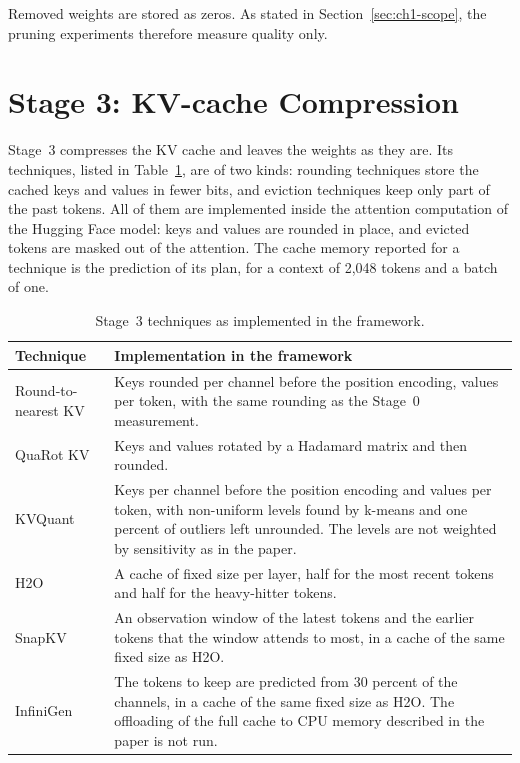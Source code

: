 Removed weights are stored as zeros. As stated in Section~\ref{sec:ch1-scope}, the pruning experiments therefore measure quality only.

\section{Stage 3: KV-cache Compression}
\label{sec:ch4-stage3}

Stage~3 compresses the KV cache and leaves the weights as they are. Its techniques, listed in Table~\ref{tab:ch4-stage3}, are of two kinds: rounding techniques store the cached keys and values in fewer bits, and eviction techniques keep only part of the past tokens. All of them are implemented inside the attention computation of the Hugging Face model: keys and values are rounded in place, and evicted tokens are masked out of the attention. The cache memory reported for a technique is the prediction of its plan, for a context of 2{,}048 tokens and a batch of one.

\begin{table}[htbp]
\centering
\small
\caption{Stage~3 techniques as implemented in the framework.}
\label{tab:ch4-stage3}
\renewcommand{\arraystretch}{1.2}
\begin{tabularx}{\textwidth}{lX}
\hline
\textbf{Technique} & \textbf{Implementation in the framework} \\
\hline
Round-to-nearest KV & Keys rounded per channel before the position encoding, values per token, with the same rounding as the Stage~0 measurement. \\
QuaRot KV \cite{ashkboos2024quarot} & Keys and values rotated by a Hadamard matrix and then rounded. \\
KVQuant \cite{hooper2024kvquant} & Keys per channel before the position encoding and values per token, with non-uniform levels found by k-means and one percent of outliers left unrounded. The levels are not weighted by sensitivity as in the paper. \\
H2O \cite{zhang2023h2o} & A cache of fixed size per layer, half for the most recent tokens and half for the heavy-hitter tokens. \\
SnapKV \cite{li2024snapkv} & An observation window of the latest tokens and the earlier tokens that the window attends to most, in a cache of the same fixed size as H2O. \\
InfiniGen \cite{lee2024infinigen} & The tokens to keep are predicted from 30 percent of the channels, in a cache of the same fixed size as H2O. The offloading of the full cache to CPU memory described in the paper is not run. \\
\hline
\end{tabularx}
\end{table}

